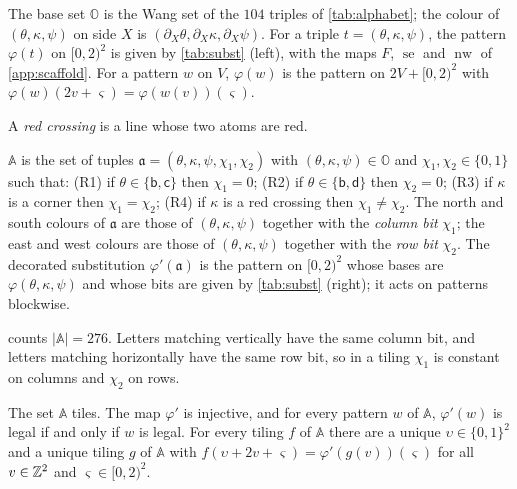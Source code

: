 \begin{definition}\label{scf:def-base}
The base set $\mathbb O$ is the Wang set of the $104$ triples of \cref{tab:alphabet}; the colour of $(\theta,\kappa,\psi)$ on side $X$ is $(\partial_X\theta,\partial_X\kappa,\partial_X\psi)$. For a triple $t=(\theta,\kappa,\psi)$, the pattern $\varphi(t)$ on $[0,2)^2$ is given by \cref{tab:subst} (left), with the maps $F$, $\operatorname{se}$ and $\operatorname{nw}$ of \cref{app:scaffold}. For a pattern $w$ on $V$, $\varphi(w)$ is the pattern on $2V+[0,2)^2$ with $\varphi(w)(2v+\varsigma)=\varphi(w(v))(\varsigma)$.
\end{definition}

A \emph{red crossing} is a line whose two atoms are red.

\begin{definition}\label{scf:def-ruler}
$\mathbb A$ is the set of tuples $\mathfrak a=(\theta,\kappa,\psi,\chi_1,\chi_2)$ with $(\theta,\kappa,\psi)\in\mathbb O$ and $\chi_1,\chi_2\in\{0,1\}$ such that: (R1) if $\theta\in\{\mathsf b,\mathsf c\}$ then $\chi_1=0$; (R2) if $\theta\in\{\mathsf b,\mathsf d\}$ then $\chi_2=0$; (R3) if $\kappa$ is a corner then $\chi_1=\chi_2$; (R4) if $\kappa$ is a red crossing then $\chi_1\ne\chi_2$. The north and south colours of $\mathfrak a$ are those of $(\theta,\kappa,\psi)$ together with the \emph{column bit} $\chi_1$; the east and west colours are those of $(\theta,\kappa,\psi)$ together with the \emph{row bit} $\chi_2$. The decorated substitution $\varphi'(\mathfrak a)$ is the pattern on $[0,2)^2$ whose bases are $\varphi(\theta,\kappa,\psi)$ and whose bits are given by \cref{tab:subst} (right); it acts on patterns blockwise.
\end{definition}

 counts $|\mathbb A|=276$. Letters matching vertically have the same column bit, and letters matching horizontally have the same row bit, so in a tiling $\chi_1$ is constant on columns and $\chi_2$ on rows.

\begin{proposition}[Desubstitution]\label{scf:desub}
The set $\mathbb A$ tiles. The map $\varphi'$ is injective, and for every pattern $w$ of $\mathbb A$, $\varphi'(w)$ is legal if and only if $w$ is legal. For every tiling $f$ of $\mathbb A$ there are a unique $\upsilon\in\{0,1\}^2$ and a unique tiling $g$ of $\mathbb A$ with $f(\upsilon+2v+\varsigma)=\varphi'(g(v))(\varsigma)$ for all $v\in\mathbb{Z}^2$ and $\varsigma\in[0,2)^2$.
\end{proposition}

